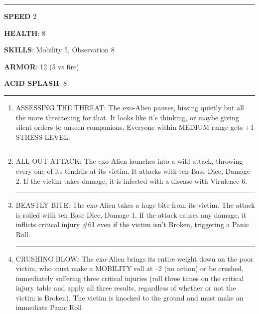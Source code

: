 \begin{rpg-commentbox}{}


    \par\noindent\rule{\textwidth}{0.4pt}

    \textbf{SPEED} 2

    \textbf{HEALTH}: 8

    \textbf{SKILLS}: Mobility 5, Observation 8
    
    \textbf{ARMOR}: 12 (5 vs fire)
    
    \textbf{ACID SPLASH}: 8

    \par\noindent\rule{\textwidth}{0.4pt}

    \begin{small}
    \begin{enumerate}
        \item ASSESSING THE THREAT: The exo-Alien pauses, hissing quietly but all the more threatening
        for that. It looks like it’s thinking, 
        or maybe giving silent orders to unseen companions. Everyone within MEDIUM range gets +1 STRESS LEVEL.

        \par\noindent\rule{.9\textwidth}{0.4pt}
        
        \item  ALL-OUT ATTACK: The exo-Alien launches into a wild attack, throwing every one of its tendrils at its victim. It attacks with ten Base Dice, Damage 2. If the victim takes damage, it is infected with a disease with Virulence 6.

        \par\noindent\rule{.9\textwidth}{0.4pt}

        \item BEASTLY BITE: The exo-Alien takes a huge bite from its victim. The attack is rolled with ten
        Base Dice, Damage 1. If the attack causes any damage, it inflicts critical injury \#61 even if
        the victim isn’t Broken, triggering a Panic Roll.
        
        \par\noindent\rule{.9\textwidth}{0.4pt}

        \item CRUSHING BLOW: The exo-Alien brings its entire weight down on the poor victim, who must
        make a MOBILITY roll at –2 (no action) or be crushed, immediately suffering three critical
        injuries (roll three times on the critical injury table and apply all three results, regardless of
        whether or not the victim is Broken). The victim is knocked to the ground and must make
        an immediate Panic Roll


\end{enumerate}
\end{small}
\end{rpg-commentbox}
